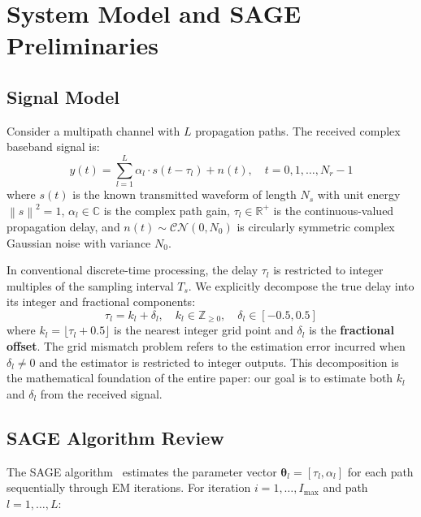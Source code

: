 \documentclass[a4paper,fleqn]{cas-dc}
\newcommand{\Cc}{\mathbb{C}}
\newcommand{\Rr}{\mathbb{R}}
\newcommand{\Zz}{\mathbb{Z}}
\newcommand{\cN}{\mathcal{CN}}
\newcommand{\norm}[1]{\left\lVert #1 \right\rVert}
\begin{document}
\section{System Model and SAGE Preliminaries}
\label{sec:system}

\subsection{Signal Model}

Consider a multipath channel with $L$ propagation paths. The received complex baseband signal is:
\begin{equation}
y(t) = \sum_{l=1}^{L} \alpha_l \cdot s(t - \tau_l) + n(t), \quad t = 0, 1, \ldots, N_r-1
\label{eq:sigmodel}
\end{equation}
where $s(t)$ is the known transmitted waveform of length $N_s$ with unit energy $\norm{s}^2 = 1$, $\alpha_l \in \Cc$ is the complex path gain, $\tau_l \in \Rr^+$ is the continuous-valued propagation delay, and $n(t) \sim \cN(0, N_0)$ is circularly symmetric complex Gaussian noise with variance $N_0$.

In conventional discrete-time processing, the delay $\tau_l$ is restricted to integer multiples of the sampling interval $T_s$. We explicitly decompose the true delay into its integer and fractional components:
\begin{equation}
\tau_l = k_l + \delta_l, \quad k_l \in \Zz_{\geq 0}, \quad \delta_l \in [-0.5, 0.5]
\label{eq:decomp}
\end{equation}
where $k_l = \lfloor \tau_l + 0.5 \rfloor$ is the nearest integer grid point and $\delta_l$ is the \textbf{fractional offset}. The grid mismatch problem refers to the estimation error incurred when $\delta_l \neq 0$ and the estimator is restricted to integer outputs. This decomposition is the mathematical foundation of the entire paper: our goal is to estimate both $k_l$ and $\delta_l$ from the received signal.

\subsection{SAGE Algorithm Review}

The SAGE algorithm~\cite{fleury1999} estimates the parameter vector $\bm{\theta}_l = [\tau_l, \alpha_l]$ for each path sequentially through EM iterations. For iteration $i = 1, \ldots, I_{\max}$ and path $l = 1, \ldots, L$:
\end{document}
